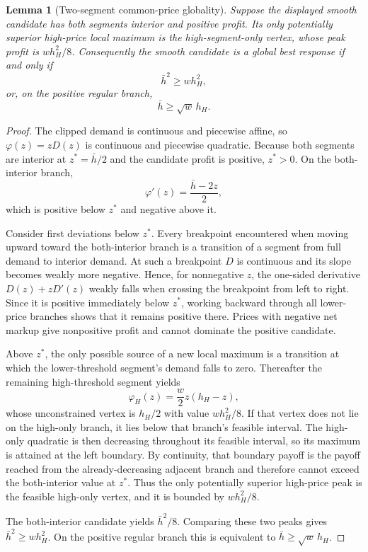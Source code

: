 \documentclass[11pt]{article}
\newtheorem{lemma}{Lemma}
\begin{document}
\begin{lemma}[Two-segment common-price globality]
Suppose the displayed smooth candidate has both segments interior and positive
profit. Its only potentially superior high-price local maximum is the
high-segment-only vertex, whose peak profit is $wh_H^2/8$. Consequently the
smooth candidate is a global best response if and only if
\[
 \bar h^2\geq wh_H^2,
\]
or, on the positive regular branch,
\[
 \bar h\geq\sqrt{w}\,h_H.
\]
\end{lemma}

\begin{proof}
The clipped demand is continuous and piecewise affine, so
$\varphi(z)=zD(z)$ is continuous and piecewise quadratic. Because both
segments are interior at $z^*=\bar h/2$ and the candidate profit is positive,
$z^*>0$. On the both-interior branch,
\[
 \varphi'(z)=\frac{\bar h-2z}{2},
\]
which is positive below $z^*$ and negative above it.

Consider first deviations below $z^*$. Every breakpoint encountered when
moving upward toward the both-interior branch is a transition of a segment from
full demand to interior demand. At such a breakpoint $D$ is continuous and its
slope becomes weakly more negative. Hence, for nonnegative $z$, the one-sided
derivative $D(z)+zD'(z)$ weakly falls when crossing the breakpoint from left to
right. Since it is positive immediately below $z^*$, working backward through
all lower-price branches shows that it remains positive there. Prices with
negative net markup give nonpositive profit and cannot dominate the positive
candidate.

Above $z^*$, the only possible source of a new local maximum is a transition
at which the lower-threshold segment's demand falls to zero. Thereafter the
remaining high-threshold segment yields
\[
 \varphi_H(z)=\frac{w}{2}z(h_H-z),
\]
whose unconstrained vertex is $h_H/2$ with value $wh_H^2/8$. If that vertex
does not lie on the high-only branch, it lies below that branch's feasible
interval.  The high-only quadratic is then decreasing throughout its feasible
interval, so its maximum is attained at the left boundary.  By continuity, that
boundary payoff is the payoff reached from the already-decreasing adjacent
branch and therefore cannot exceed the both-interior value at $z^*$.  Thus the
only potentially superior high-price peak is the feasible high-only vertex,
and it is bounded by $wh_H^2/8$.

The both-interior candidate yields $\bar h^2/8$. Comparing these two peaks
gives $\bar h^2\geq wh_H^2$. On the positive regular branch this is equivalent
to $\bar h\geq\sqrt w\,h_H$.
\end{proof}
\end{document}
